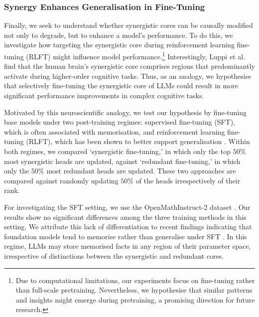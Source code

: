 \documentclass[11pt,a4paper]{ouparticle}
\begin{document}
\subsubsection*{Synergy Enhances Generalisation in Fine-Tuning}

Finally, we seek to understand whether synergistic cores can be causally modified not only to degrade, but to enhance a model's performance.
To do this, we investigate how targeting the synergistic core during reinforcement learning fine-tuning (RLFT) might influence model performance.\footnote{Due to computational limitations, our experiments focus on fine-tuning rather than full-scale pretraining. Nevertheless, we hypothesise that similar patterns and insights might emerge during pretraining, a promising direction for future research.} Interestingly, Luppi et al. \cite{luppi2022synergistic} find that the human brain's synergistic core comprises regions that predominantly activate during higher-order cognitive tasks. Thus, as an analogy, we hypothesise that selectively fine-tuning the synergistic core of LLMs could result in more significant performance improvements in complex cognitive tasks.

Motivated by this neuroscientific analogy, we test our hypothesis by fine-tuning base models under two post-training regimes: supervised fine-tuning (SFT), which is often associated with memorisation, and reinforcement learning fine-tuning (RLFT), which has been shown to better support generalisation \cite{chu2025sft}. Within both regimes, we compared `synergistic fine-tuning,' in which only the top $50\%$ most synergistic heads are updated, against `redundant fine-tuning,' in which only the $50\%$ most redundant heads are updated. These two approaches are compared against randomly updating $50\%$ of the heads irrespectively of their rank. 

For investigating the SFT setting, we use the OpenMathInstruct-2 dataset \cite{toshniwal2024openmathinstruct2}. 
Our results show no significant differences among the three training methods in this setting. We attribute this lack of differentiation to recent findings indicating that foundation models tend to memorise rather than generalise under SFT \cite{chu2025sft}. In this regime, LLMs may store memorised facts in any region of their parameter space, irrespective of distinctions between the synergistic and redundant cores. 
\end{document}
